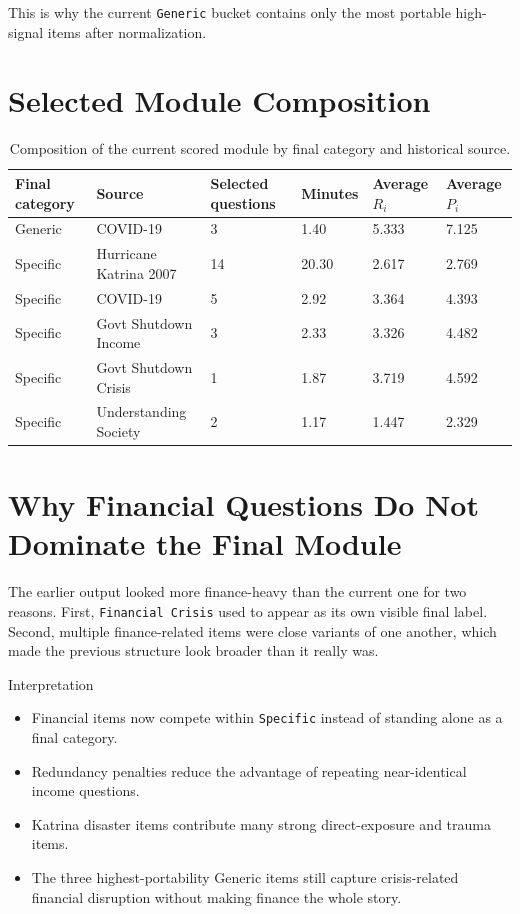 \documentclass[12pt]{article}
\begin{document}
This is why the current \texttt{Generic} bucket contains only the most portable high-signal items after normalization.

\section{Selected Module Composition}

\begin{table}[H]
\centering
\footnotesize
\begin{tabularx}{\textwidth}{@{}L{0.14\textwidth} L{0.22\textwidth} R{0.11\textwidth} R{0.09\textwidth} R{0.10\textwidth} R{0.10\textwidth}@{}}
\toprule
Final category & Source & Selected questions & Minutes & Average $R_i$ & Average $P_i$ \\
\midrule
Generic & COVID-19 & 3 & 1.40 & 5.333 & 7.125 \\
Specific & Hurricane Katrina 2007 & 14 & 20.30 & 2.617 & 2.769 \\
Specific & COVID-19 & 5 & 2.92 & 3.364 & 4.393 \\
Specific & Govt Shutdown Income & 3 & 2.33 & 3.326 & 4.482 \\
Specific & Govt Shutdown Crisis & 1 & 1.87 & 3.719 & 4.592 \\
Specific & Understanding Society & 2 & 1.17 & 1.447 & 2.329 \\
\bottomrule
\end{tabularx}
\caption{Composition of the current scored module by final category and historical source.}
\end{table}

\section{Why Financial Questions Do Not Dominate the Final Module}

The earlier output looked more finance-heavy than the current one for two reasons. First, \texttt{Financial Crisis} used to appear as its own visible final label. Second, multiple finance-related items were close variants of one another, which made the previous structure look broader than it really was.

\begin{psidbox}{Interpretation}
\begin{itemize}
\item Financial items now compete within \texttt{Specific} instead of standing alone as a final category.
\item Redundancy penalties reduce the advantage of repeating near-identical income questions.
\item Katrina disaster items contribute many strong direct-exposure and trauma items.
\item The three highest-portability Generic items still capture crisis-related financial disruption without making finance the whole story.
\end{itemize}
\end{psidbox}
\end{document}
